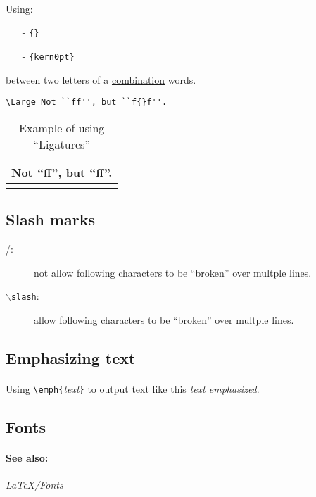 \documentclass[11pt,a4paper]{article}
\begin{document}
\paragraph{}
Using:
\begin{itemize}
	\item[-] \verb|{}|
	\item[-] \verb|{kern0pt}|
\end{itemize}
between two letters of a \underline{combination} words.
\begin{verbatim}
\Large Not ``ff'', but ``f{}f''.
\end{verbatim}
\begin{table}[htbp]
	\centering
	\begin{tabular}{@{} c @{}}
		\hline\noalign{\smallskip}
		\Large Not ``ff'', but ``f{}f''. \\
		\hline\noalign{\smallskip}
	\end{tabular}
	\caption{Example of using ``Ligatures''}
	\label{ligature}
\end{table}

\subsection{Slash marks}
\begin{description}
	\item[/:] not allow following characters to be ``broken'' over multple lines.
	\item[\texttt{$\backslash$slash}:] allow following characters to be ``broken'' over multple lines.
\end{description}

\subsection{Emphasizing text}

\paragraph{}
Using \verb|\emph{|\emph{text}\verb|}| to output text like this \emph{text emphasized}.

\subsection{Fonts}

\paragraph{See also:} \emph{\LaTeX{}/Fonts}
\end{document}
